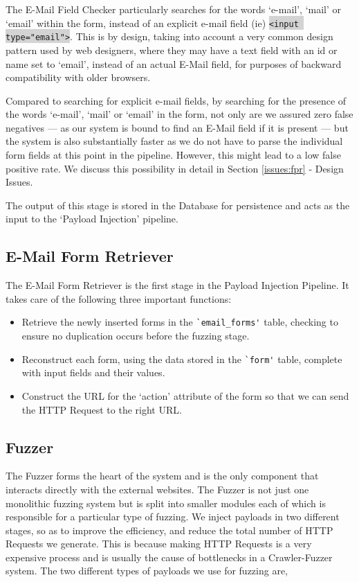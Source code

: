 The E-Mail Field Checker particularly searches for the words `e-mail', `mail' or `email' within the form, instead of an explicit e-mail field (ie) \colorbox{lightgray}{\lstinline{<input type="email">}}. This is by design, taking into account a very common design pattern used by web designers, where they may have a text field with an id or name set to `email', instead of an actual E-Mail field, for purposes of backward compatibility with older browsers.

Compared to searching for explicit e-mail fields, by searching for the presence of the words `e-mail', `mail' or `email' in the form, not only are we assured zero false negatives --- as our system is bound to find an E-Mail field if it is present --- but the system is also substantially faster as we do not have to parse the individual form fields at this point in the pipeline. However, this might lead to a low false positive rate. We discuss this possibility in detail in Section \ref*{issues:fpr} - Design Issues. 

The output of this stage is stored in the Database for persistence and acts as the input to the `Payload Injection' pipeline.


\subsection{E-Mail Form Retriever}
\label{Comp:EMFR}
The E-Mail Form Retriever is the first stage in the Payload Injection Pipeline. It takes care of the following three important functions:
\begin{itemize}
	\item Retrieve the newly inserted forms in the \lstinline{`email_forms'} table, checking to ensure no duplication occurs before the fuzzing stage.
	\item Reconstruct each form, using the data stored in the \lstinline{`form'} table, complete with input fields and their values.
	\item Construct the URL for the `action' attribute of the form so that we can send the HTTP Request to the right URL. 
\end{itemize}

\subsection{Fuzzer}
\label{Comp:Fuzzer}
The Fuzzer forms the heart of the system and is the only component that interacts directly with the external websites. The Fuzzer is not just one monolithic fuzzing system but is split into smaller modules each of which is responsible for a particular type of fuzzing.  We inject payloads in two different stages, so as to improve the efficiency, and reduce the total number of HTTP Requests we generate. This is because making HTTP Requests is a very expensive process and is usually the cause of bottlenecks in a Crawler-Fuzzer system.
The two different types of payloads we use for fuzzing are,
